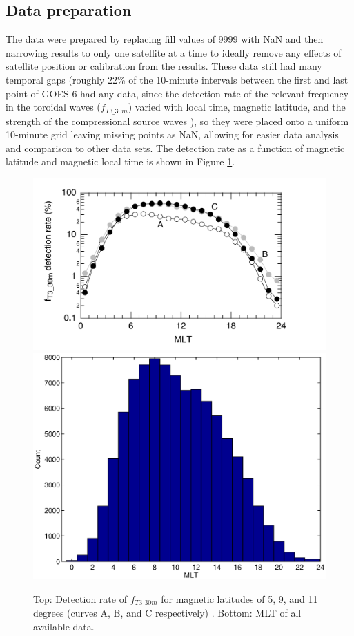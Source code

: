 \subsection{Data preparation}
The data were prepared by replacing fill values of 9999 with NaN and then narrowing results to only one satellite at a time to ideally remove any effects of satellite position or calibration from the results. These data still had many temporal gaps (roughly 22\% of the 10-minute intervals between the first and last point of GOES 6 had any data, since the detection rate of the relevant frequency in the toroidal waves ($f_{T3\_30m}$) varied with local time, magnetic latitude, and the strength of the compressional source waves \citep{Takahashi2010SolarCycleVariation}), so they were placed onto a uniform 10-minute grid leaving missing points as NaN, allowing for easier data analysis and comparison to other data sets. The detection rate as a function of magnetic latitude and magnetic local time is shown in Figure \ref{fig:Takahashi2010Availability}.

\begin{figure}[htp!]
	\centering
	\includegraphics[width=0.8\linewidth]{Figures/Takahashi2010Availability.png}
	\includegraphics[width=0.8\linewidth]{Figures/databyMLT}
	\caption{Top: Detection rate of $f_{T3\_30m}$ for magnetic latitudes of 5, 9, and 11 degrees (curves A, B, and C respectively) \citep{Takahashi2010SolarCycleVariation}. Bottom: MLT of all available data.}
	\label{fig:Takahashi2010Availability}
\end{figure}


